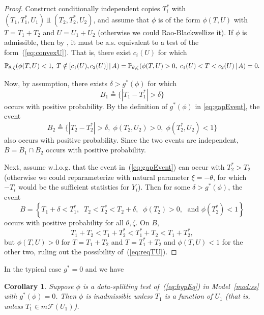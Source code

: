 \documentclass{article}
\newtheorem{corollary}[theorem]{Corollary}
\theoremstyle{definition}
\newcommand{\msF}{m\mathscr{F}}
\begin{document}
\begin{proof}
  Construct conditionally independent copies $T_i^*$ with $(T_1,T_1^*,U_1) \Perp (T_2,T_2^*,U_2)$, and assume that $\phi$ is of the form $\phi(T, U)$ with $T=T_1+T_2$ and $U=U_1+U_2$ (otherwise we could Rao-Blackwellize it). If $\phi$ is admissible, then by \citet{matthes1967tests}, it must be a.s. equivalent to a test of the form~(\ref{eq:convexU}). That is, there exist $c_i(U)$ for which
  \begin{equation}\label{eq:reqTU}
  \mathbb{P}_{\theta,\zeta}(\phi(T,U) < 1, \; T \notin [c_1(U),c_2(U)] \,|\, A) =
  \mathbb{P}_{\theta,\zeta}(\phi(T,U) > 0, \; c_1(U) < T < c_2(U)\,|\, A) = 0.
  \end{equation}

Now, by assumption, there exists $\delta > g^*(\phi)$ for which
\[ B_1 \triangleq \{ |T_1 - T_1^*| > \delta \} \]
occurs with positive probability. By the definition of $g^*(\phi)$ in \eqref{eq:gapEvent}, the event
\[ B_2 \triangleq \{ |T_2 - T_2^*| > \delta,\; \phi(T_2, U_2) > 0,\; \phi(T_2^*, U_2) < 1 \} \]
also occurs with positive probability. Since the two events are independent, $B = B_1 \cap B_2$ occurs with positive probability.



  Next, assume w.l.o.g. that the event in~(\ref{eq:gapEvent}) can occur with $T_2^*>T_2$ (otherwise we could reparameterize with natural parameter $\xi=-\theta$, for which $-T_i$ would be the sufficient statistics for $Y_i$). Then for some $\delta>g^*(\phi)$, the event
  \[
  B = \left\{T_1 + \delta < T_1^*,\;\; T_2 < T_2^* < T_2 + \delta,\;\; \phi(T_2) > 0,\; \text{ and } \phi(T_2^*) < 1\right\}
  \]
  occurs with positive probability for all $\theta,\zeta$. On $B$,
  \[
  T_1 + T_2 < T_1 + T_2^* < T_1^* + T_2 < T_1 + T_2^*,
  \]
  but $\phi(T,U) > 0$ for $T=T_1+T_2$ and $T=T_1^*+T_2$ and $\phi(T,U)<1$ for the other two, ruling out the possibility of~(\ref{eq:reqTU}).
\end{proof}

In the typical case $g^*=0$ and we have
\begin{corollary}
  Suppose $\phi$ is a data-splitting test of~(\ref{eq:hypEq}) in Model~\ref{mod:ss} with $g^*(\phi) = 0$. Then $\phi$ is inadmissible unless $T_1$ is a function of $U_1$ (that is, unless $T_1\in \msF(U_1)$).
\end{corollary}
\end{document}
